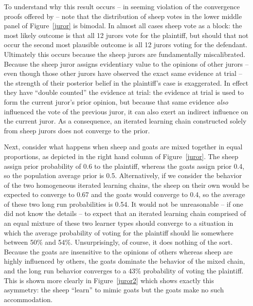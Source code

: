 \documentclass[doc]{apa6}
\begin{document}

To understand why this result occurs -- in seeming violation of the convergence proofs offered by \textcite{griffiths_language_2007} -- note that the distribution of {\sc sheep} votes in the lower middle panel of Figure~\ref{juror} is bimodal. In almost all cases {\sc sheep} vote as a block: the most likely outcome is that all 12 jurors vote for the plaintiff, but should that not occur the second most plausible outcome is all 12 jurors voting for the defendant. Ultimately this occurs because the {\sc sheep} jurors are fundamentally miscalibrated. Because the {\sc sheep} juror assigns evidentiary value to the opinions of other jurors -- even though those other jurors have observed the exact same evidence at trial -- the strength of their posterior belief in the plaintiff's case is exaggerated. In effect they have ``double counted'' the evidence at trial: the evidence at trial is used to form the current juror's prior opinion, but because that same evidence {\it also} influenced the vote of the previous juror, it can also exert an indirect influence on the current juror. As a consequence, an iterated learning chain constructed solely from {\sc sheep} jurors does not converge to the prior.

Next, consider what happens when {\sc sheep} and {\sc goats} are mixed together in equal proportions, as depicted in the right hand column of Figure~\ref{juror}. The {\sc sheep} assign prior probability of 0.6 to the plaintiff, whereas the {\sc goats} assign prior 0.4, so the population average prior is 0.5. Alternatively, if we consider the behavior of the two homogeneous iterated learning chains, the {\sc sheep} on their own would be expected to converge to 0.67 and the {\sc goats} would converge to 0.4, so the average of these two long run probabilities is 0.54. It would not be unreasonable -- if one did not know the details -- to expect that an iterated learning chain comprised of an equal mixture of these two learner types should converge to a situation in which the average probability of voting for the plaintiff should lie somewhere between 50\% and 54\%. Unsurprisingly, of course, it does nothing of the sort. Because the {\sc goats} are insensitive to the opinions of others whereas {\sc sheep} are highly influenced by others, the {\sc goats} dominate the behavior of the mixed chain, and the long run behavior converges to a 43\% probability of voting the plaintiff. This is shown more clearly in Figure~\ref{juror2} which shows exactly this asymmetry: the {\sc sheep} ``learn'' to mimic {\sc goats} but the {\sc goats} make no such accommodation.
\end{document}
